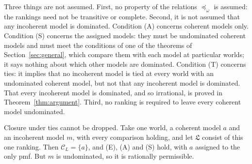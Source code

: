 \documentclass[11pt]{article}
\theoremstyle{definition}
\newcommand{\C}{\mathcal C}
\newcommand{\Lf}{\mathfrak L}
\begin{document}
Three things are not assumed. First, no property of the relations $\preceq_\omega$ is assumed: the rankings need not be transitive or complete. Second, it is not assumed that any incoherent model is dominated. Condition (A) concerns coherent models only. Condition (S) concerns the assigned models: they must be undominated coherent models and must meet the conditions of one of the theorems of Section~\ref{sec:general}, which compare them with each model at particular worlds; it says nothing about which other models are dominated. Condition (T) concerns ties: it implies that no incoherent model is tied at every world with an undominated coherent model, but not that any incoherent model is dominated. That every incoherent model is dominated, and so irrational, is proved in Theorem~\ref{thm:argument}. Third, no ranking is required to leave every coherent model undominated.

Closure under ties cannot be dropped. Take one world, a coherent model $a$ and an incoherent model $m$, with every comparison holding, and let $\Lf$ consist of this one ranking. Then $\C_L=\{a\}$, and (E), (A) and (S) hold, with $a$ assigned to the only pmf. But $m$ is undominated, so it is rationally permissible.
\end{document}
